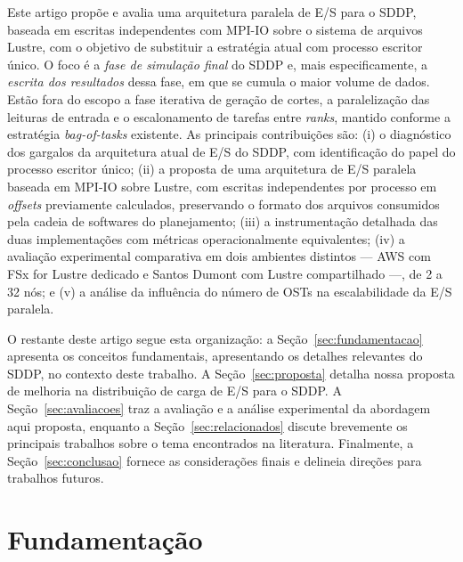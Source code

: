 \documentclass[12pt]{article}
\begin{document}
Este artigo propõe e avalia uma arquitetura paralela de E/S para o SDDP, baseada em escritas independentes com MPI-IO sobre o sistema de arquivos Lustre, com o objetivo de substituir a estratégia atual com processo escritor único. O foco é a \emph{fase de simulação final} do SDDP e, mais especificamente, a \emph{escrita dos resultados} dessa fase, em que se cumula o maior volume de dados. Estão fora do escopo a fase iterativa de geração de cortes, a paralelização das leituras de entrada e o escalonamento de tarefas entre \textit{ranks}, mantido conforme a estratégia \textit{bag-of-tasks} existente. As principais contribuições são: (i) o diagnóstico dos gargalos da arquitetura atual de E/S do SDDP, com identificação do papel do processo escritor único; (ii) a proposta de uma arquitetura de E/S paralela baseada em MPI-IO sobre Lustre, com escritas independentes por processo em \textit{offsets} previamente calculados, preservando o formato dos arquivos consumidos pela cadeia de softwares do planejamento; (iii) a instrumentação detalhada das duas implementações com métricas operacionalmente equivalentes; (iv) a avaliação experimental comparativa em dois ambientes distintos --- AWS com FSx for Lustre dedicado e Santos Dumont com Lustre compartilhado ---, de 2 a 32 nós; e (v) a análise da influência do número de OSTs na escalabilidade da E/S paralela.

O restante deste artigo segue esta organização: a Seção~\ref{sec:fundamentacao} apresenta os conceitos fundamentais, apresentando os detalhes relevantes do SDDP, no contexto deste trabalho. A Seção~\ref{sec:proposta} detalha nossa proposta de melhoria na distribuição de carga de E/S para o SDDP. A Seção~\ref{sec:avaliacoes} traz a avaliação e a análise experimental da abordagem aqui proposta, enquanto a Seção~\ref{sec:relacionados} discute brevemente os principais trabalhos sobre o tema encontrados na literatura. Finalmente, a Seção~\ref{sec:conclusao} fornece as considerações finais e delineia direções para trabalhos futuros.

\section{Fundamentação}~\label{sec:fundamentacao}
\end{document}
